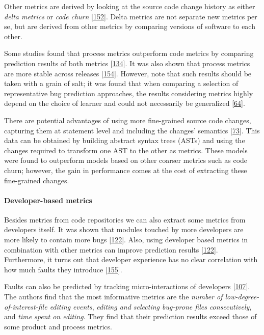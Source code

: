 \documentclass[]{book}
\let\oldparagraph\paragraph
\renewcommand{\paragraph}[1]{\oldparagraph{#1}\mbox{}}
\begin{document}
Other metrics are derived by looking at the source code change history
as either \emph{delta metrics} or \emph{code churn}
{[}\protect\hyperlink{ref-Radjenovic2013}{152}{]}. Delta metrics are not
separate new metrics per se, but are derived from other metrics by
comparing versions of software to each other.

Some studies found that process metrics outperform code metrics by
comparing prediction results of both metrics
{[}\protect\hyperlink{ref-Moser2008}{134}{]}. It was also shown that
process metrics are more stable across releases
{[}\protect\hyperlink{ref-Rahman2013}{154}{]}. However, note that such
results should be taken with a grain of salt; it was found that when
comparing a selection of representative bug prediction approaches, the
results considering metrics highly depend on the choice of learner and
could not necessarily be generalized
{[}\protect\hyperlink{ref-DAmbros2012}{64}{]}.

There are potential advantages of using more fine-grained source code
changes, capturing them at statement level and including the changes'
semantics {[}\protect\hyperlink{ref-Giger2011}{73}{]}. This data can be
obtained by building abstract syntax trees (ASTs) and using the changes
required to transform one AST to the other as metrics. These models were
found to outperform models based on other coarser metrics such as code
churn; however, the gain in performance comes at the cost of extracting
these fine-grained changes.

\paragraph{Developer-based metrics}\label{developer-based-metrics}

Besides metrics from code repositories we can also extract some metrics
from developers itself. It was shown that modules touched by more
developers are more likely to contain more bugs
{[}\protect\hyperlink{ref-Matsumoto2010}{122}{]}. Also, using developer
based metrics in combination with other metrics can improve prediction
results {[}\protect\hyperlink{ref-Matsumoto2010}{122}{]}. Furthermore,
it turns out that developer experience has no clear correlation with how
much faults they introduce
{[}\protect\hyperlink{ref-rahman2011}{155}{]}.

Faults can also be predicted by tracking micro-interactions of
developers {[}\protect\hyperlink{ref-Lee2011}{107}{]}. The authors find
that the most informative metrics are the \emph{number of
low-degree-of-interest-file editing events}, \emph{editing and selecting
bug-prone files consecutively}, and \emph{time spent on editing}. They
find that their prediction results exceed those of some product and
process metrics.
\end{document}
